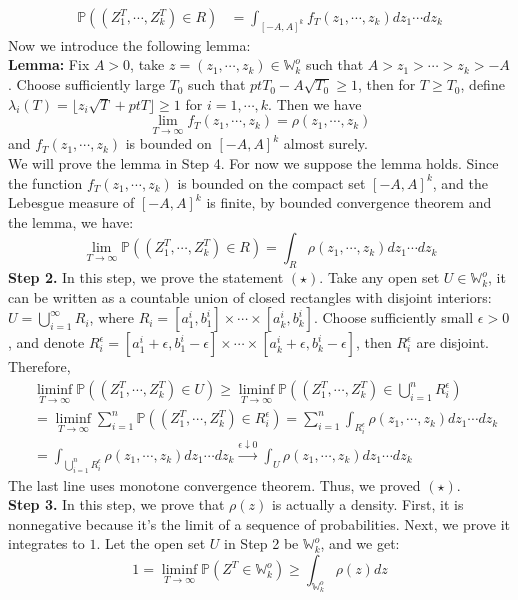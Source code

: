 \documentclass[12pt]{article}
\begin{document}
\begin{align*}
\mathbb{P}((Z_{1}^{T},\cdots,Z_{k}^{T})\in R)&=\int_{[-A,A]^{k}}f_{T}(z_{1},\cdots,z_{k})dz_{1}\cdots dz_{k}
\end{align*}
Now we introduce the following lemma:\\
\textbf{Lemma: }Fix $A>0$, take $z=(z_{1},\cdots,z_{k})\in\mathbb{W}_{k}^{o}$ such that $A>z_{1}>\cdots>z_{k}>-A$. Choose sufficiently large $T_{0}$ such that $ptT_{0}-A\sqrt{T_{0}}\geqslant 1$, then for $T\geqslant T_{0}$, define $\lambda_{i}(T)=\lfloor z_{i}\sqrt{T}+ptT\rfloor\geqslant 1$ for $i=1,\cdots,k$. Then we have
$$\lim_{T\rightarrow\infty}f_{T}(z_{1},\cdots,z_{k})=\rho(z_{1},\cdots,z_{k})$$ and $f_{T}(z_{1},\cdots,z_{k})$ is bounded on $[-A,A]^{k}$ almost surely.\\
We will prove the lemma in Step 4. For now we suppose the lemma holds. Since the function $f_{T}(z_{1},\cdots,z_{k})$ is bounded on the compact set $[-A,A]^{k}$, and the Lebesgue measure of $[-A,A]^{k}$ is finite, by bounded convergence theorem and the lemma, we have:
$$\lim_{T\rightarrow\infty}\mathbb{P}((Z_{1}^{T},\cdots,Z_{k}^{T})\in R)=\int_{R}\rho(z_{1},\cdots,z_{k})dz_{1}\cdots dz_{k}$$
\textbf{Step 2. }In this step, we prove the statement $(\star)$. Take any open set $U\in \mathbb{W}_{k}^{o}$, it can be written as a countable union of closed rectangles with disjoint interiors: $U=\bigcup_{i=1}^{\infty}R_{i}$, where $R_{i}=[a_{1}^{i},b_{1}^{i}]\times\cdots\times[a_{k}^{i},b_{k}^{i}]$. Choose sufficiently small $\epsilon>0$, and denote $R_{i}^{\epsilon}=[a_{1}^{i}+\epsilon,b_{1}^{i}-\epsilon]\times\cdots\times[a_{k}^{i}+\epsilon,b_{k}^{i}-\epsilon]$, then $R_{i}^{\epsilon}$ are disjoint. Therefore,
\begin{align*}
	&\liminf_{T\rightarrow\infty}\mathbb{P}((Z_{1}^{T},\cdots,Z_{k}^{T})\in U)\geqslant\liminf_{T\rightarrow\infty}\mathbb{P}((Z_{1}^{T},\cdots,Z_{k}^{T})\in \bigcup_{i=1}^{n}R_{i}^{\epsilon})\\
	&=\liminf_{T\rightarrow\infty}\sum_{i=1}^{n}\mathbb{P}((Z_{1}^{T},\cdots,Z_{k}^{T})\in R_{i}^{\epsilon})=\sum_{i=1}^{n}\int_{R_{i}^{\epsilon}}\rho(z_1,\cdots,z_{k})dz_{1}\cdots dz_{k}\\
	&=\int_{\bigcup_{i=1}^{n}R_{i}^{\epsilon}}\rho(z_1,\cdots,z_{k})dz_{1}\cdots dz_{k} \xrightarrow{\epsilon\downarrow 0} \int_{U}\rho(z_1,\cdots,z_{k})dz_{1}\cdots dz_{k}
\end{align*}
The last line uses monotone convergence theorem. Thus, we proved $(\star)$.\\
\textbf{Step 3. }In this step, we prove that $\rho(z)$ is actually a density. First, it is nonnegative because it's the limit of a sequence of probabilities. Next, we prove it integrates to $1$. Let the open set $U$ in Step 2 be $\mathbb{W}_{k}^{o}$, and we get: $$1=\liminf_{T\rightarrow\infty}\mathbb{P}(Z^{T}\in \mathbb{W}_{k}^{o})\geqslant \int_{\mathbb{W}_{k}^{o}}\rho(z)dz$$
\end{document}
